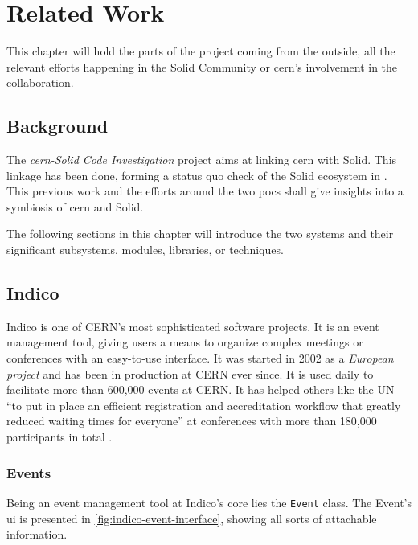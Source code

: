 \chapter{Related Work}

This chapter will hold the parts of the project coming from the outside, all the relevant efforts happening in the Solid Community or \gls{cern}'s involvement in the collaboration.

\section{Background}

The \textit{\gls{cern}-Solid Code Investigation} project \cite{cern-solid-code-investigation-project-description} aims at linking \gls{cern} with Solid. This linkage has been done, forming a status quo check of the Solid ecosystem in \cite{cern-solid-investigation-spec}. This previous work and the efforts around the two \glspl{poc} shall give insights into a symbiosis of \gls{cern} and Solid.

The following sections in this chapter will introduce the two systems and their significant subsystems, modules, libraries, or techniques. 

\section{Indico}

Indico is one of CERN’s most sophisticated software projects. It is an event management tool, giving users a means to organize complex meetings or conferences with an easy-to-use interface. It was started in 2002 as a \textit{European project} and has been in production at CERN ever since. It is used daily to facilitate more than 600,000 events at CERN. It has helped others like the UN “to put in place an efficient registration and accreditation workflow that greatly reduced waiting times for everyone” at conferences with more than 180,000 participants in total \cite{cern-solid-investigation-spec}.

\subsection{Events}

Being an event management tool at Indico's core lies the \texttt{Event} class. The Event's \gls{ui} is presented in \ref{fig:indico-event-interface}, showing all sorts of attachable information. 

